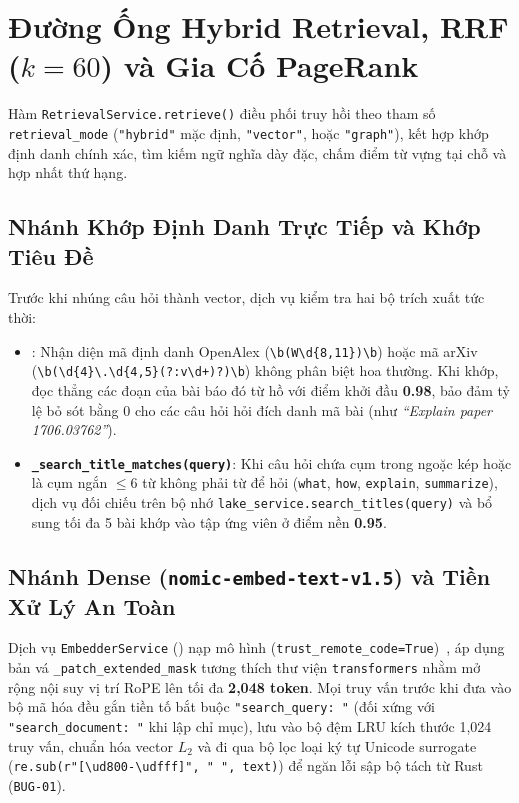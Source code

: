 \FloatBarrier
\section{\texorpdfstring{Đường Ống Hybrid Retrieval, RRF ($k=60$) và Gia Cố PageRank}{Duong Ong Hybrid Retrieval, RRF (k=60) va Gia Co PageRank}}
\label{sec:ch4_hybrid_retrieval}

Hàm \texttt{RetrievalService.retrieve()} điều phối truy hồi theo tham số \texttt{retrieval\_mode} (\texttt{"hybrid"} mặc định, \texttt{"vector"}, hoặc \texttt{"graph"}), kết hợp khớp định danh chính xác, tìm kiếm ngữ nghĩa dày đặc, chấm điểm từ vựng tại chỗ và hợp nhất thứ hạng.

\subsection{Nhánh Khớp Định Danh Trực Tiếp và Khớp Tiêu Đề}
\label{sec:ch4_id_title_match}

Trước khi nhúng câu hỏi thành vector, dịch vụ kiểm tra hai bộ trích xuất tức thời:
\begin{itemize}
  \item \textbf{}: Nhận diện mã định danh OpenAlex (\texttt{\textbackslash b(W\textbackslash d\{8,11\})\textbackslash b}) hoặc mã arXiv (\texttt{\textbackslash b(\textbackslash d\{4\}\textbackslash.\textbackslash d\{4,5\}\allowbreak(?:v\textbackslash d+)?)\textbackslash b}) không phân biệt hoa thường. Khi khớp,  đọc thẳng các đoạn của bài báo đó từ hồ với điểm khởi đầu \textbf{0.98}, bảo đảm tỷ lệ bỏ sót bằng 0 cho các câu hỏi hỏi đích danh mã bài (như \textit{``Explain paper 1706.03762''}).
  \item \textbf{\texttt{\_search\_title\_matches(query)}}: Khi câu hỏi chứa cụm trong ngoặc kép hoặc là cụm ngắn $\le 6$ từ không phải từ để hỏi (\texttt{what}, \texttt{how}, \texttt{explain}, \texttt{summarize}), dịch vụ đối chiếu trên bộ nhớ \texttt{lake\_service.search\_titles(query)} và bổ sung tối đa 5 bài khớp vào tập ứng viên ở điểm nền \textbf{0.95}.
\end{itemize}

\subsection{Nhánh Dense (\texttt{nomic-embed-text-v1.5}) và Tiền Xử Lý An Toàn}
\label{sec:ch4_dense_branch}

Dịch vụ \texttt{EmbedderService} () nạp mô hình  (\texttt{trust\_remote\_code=True})~\cite{nussbaum2024nomic,nomicmodelcard2024}, áp dụng bản vá \texttt{\_patch\_extended\_mask} tương thích thư viện \texttt{transformers} nhằm mở rộng nội suy vị trí RoPE lên tối đa \textbf{2,048 token}. Mọi truy vấn trước khi đưa vào bộ mã hóa đều gắn tiền tố bắt buộc \texttt{"search\_query: "} (đối xứng với \texttt{"search\_document: "} khi lập chỉ mục), lưu vào bộ đệm LRU kích thước 1,024 truy vấn, chuẩn hóa vector $L_2$ và đi qua bộ lọc loại ký tự Unicode surrogate (\texttt{re.sub(r"[\textbackslash ud800-\textbackslash udfff]", " ", text)}) để ngăn lỗi sập bộ tách từ Rust (\texttt{BUG-01}).

